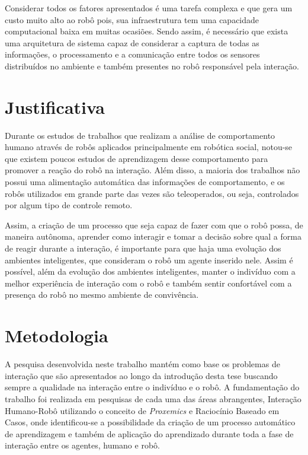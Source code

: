 Considerar todos os fatores apresentados é uma tarefa complexa e que gera um custo muito alto ao robô pois, sua infraestrutura tem uma capacidade computacional baixa em muitas ocasiões. Sendo assim, é necessário que exista uma arquitetura de sistema capaz de considerar a captura de todas as informações, o processamento e a comunicação entre todos os sensores distribuídos no ambiente e também presentes no robô responsável pela interação.

\section{Justificativa}
Durante os estudos de trabalhos que realizam a análise de comportamento humano através de robôs aplicados principalmente em robótica social, notou-se que existem poucos estudos de aprendizagem desse comportamento para promover a reação do robô na interação. Além disso, a maioria dos trabalhos não possui uma alimentação automática das informações de comportamento, e os robôs utilizados em grande parte das vezes são teleoperados, ou seja, controlados por algum tipo de controle remoto.

Assim, a criação de um processo que seja capaz de fazer com que o robô possa, de maneira autônoma, aprender como interagir e tomar a decisão sobre qual a forma de reagir durante a interação, é importante para que haja uma evolução dos ambientes inteligentes, que consideram o robô um agente inserido nele. Assim é possível, além da evolução dos ambientes inteligentes, manter o indivíduo com a melhor experiência de interação com o robô e também sentir confortável com a presença do robô no mesmo ambiente de convivência.

\section{Metodologia}
A pesquisa desenvolvida neste trabalho mantém como base os problemas de interação que são apresentados ao longo da introdução desta tese buscando sempre a qualidade na interação entre o indivíduo e o robô. A fundamentação do trabalho foi realizada em pesquisas de cada uma das áreas abrangentes, Interação Humano-Robô utilizando o conceito de \emph{Proxemics} e Raciocínio Baseado em Casos, onde identificou-se a possibilidade da criação de um processo automático de aprendizagem e também de aplicação do aprendizado durante toda a fase de interação entre os agentes, humano e robô.

